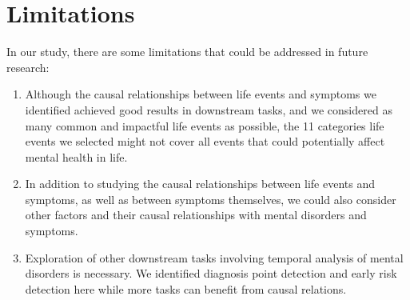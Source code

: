 \section{Limitations}
In our study, there are some limitations that could be addressed in future research:
\begin{enumerate}
    \item Although the causal relationships between life events and symptoms we identified achieved good results in downstream tasks, and we considered as many common and impactful life events as possible, the 11 categories life events we selected might not cover all events that could potentially affect mental health in life. 
    \item In addition to studying the causal relationships between life events and symptoms, as well as between symptoms themselves, we could also consider other factors and their causal relationships with mental disorders and symptoms. 
    \item Exploration of other downstream tasks involving temporal analysis of mental disorders is necessary. We identified diagnosis point detection and early risk detection here while more tasks can benefit from causal relations.
\end{enumerate}



